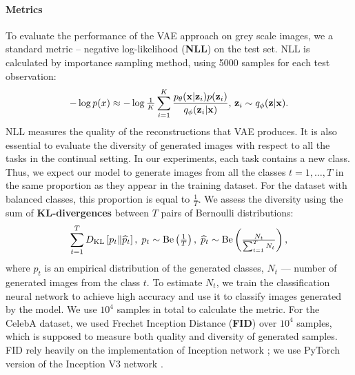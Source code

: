 \paragraph{Metrics} To evaluate the performance of the VAE approach on grey scale images, we a standard metric -- negative log-likelihood (\textbf{NLL}) on the test set. NLL is calculated by importance sampling method, using 5000 samples for each test observation: 
\begin{equation*}
\setlength{\abovedisplayskip}{3.5pt}
\setlength{\belowdisplayskip}{3.5pt}
-\log p(x) \approx -\log \tfrac{1}{K} 
\sum_{i = 1}^K \frac{p_\theta(\rvx |\rvz_i) p(\rvz_i)}{q_\phi(\rvz_i | \rvx)},\,\rvz_i \sim q_\phi(\rvz| \rvx).
\end{equation*}
NLL measures the quality of the reconstructions that VAE produces. It is also essential to evaluate the diversity of generated images with respect to all the tasks in the continual setting. In our experiments, each task contains a new class. Thus, we expect our model to generate images from all the classes $t=1,\dots, T$ in the same proportion as they appear in the training dataset. For the dataset with balanced classes, this proportion is equal to $\tfrac{1}{T}$. We assess the diversity using the sum of \textbf{KL-divergences} between $T$ pairs of Bernoulli distributions:
\begin{equation*}
\setlength{\abovedisplayskip}{3.5pt}
\setlength{\belowdisplayskip}{3.5pt}
\sum_{t=1}^{T}\KL{p_t}{\widehat{p}_t},\; p_t \sim \text{Be}\left(\tfrac1T\right),\;  \widehat{p}_t \sim \text{Be}\left(\tfrac{N_t}{\sum_{t=1}^{T}N_t}\right), 
\end{equation*}
where $ \widehat{p}_t$ is an empirical distribution of the generated classes, $N_t$ --- number of generated images from the class $t$. To estimate $N_t$, we train the classification neural network to achieve high accuracy and use it to classify images generated by the model. We use $10^4$ samples in total to calculate the metric.
For the CelebA dataset, we used Frechet Inception Distance (\textbf{FID}) \citep{heusel2017gans} over $10^4$ samples, which is supposed to measure both quality and diversity of generated samples. FID rely heavily on the implementation of Inception network \citep{barratt2018note}; we use PyTorch version of the Inception V3 network \citep{paszke2017automatic}.
